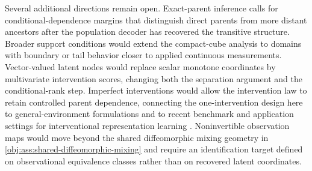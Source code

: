 Several additional directions remain open. Exact-parent inference calls for conditional-dependence margins that distinguish direct parents from more distant ancestors after the population decoder has recovered the transitive structure. Broader support conditions would extend the compact-cube analysis to domains with boundary or tail behavior closer to applied continuous measurements. Vector-valued latent nodes would replace scalar monotone coordinates by multivariate intervention scores, changing both the separation argument and the conditional-rank step. Imperfect interventions would allow the intervention law to retain controlled parent dependence, connecting the one-intervention design here to general-environment formulations \citep{NgEtAl2025GeneralEnvironments,Jin2024,Zhang2024,Ahuja2024} and to recent benchmark and application settings for interventional representation learning \citep{Chen2025,Wang2024,Sun2024}. Noninvertible observation maps would move beyond the shared diffeomorphic mixing geometry in \cref{obj:ass:shared-diffeomorphic-mixing} and require an identification target defined on observational equivalence classes rather than on recovered latent coordinates.
